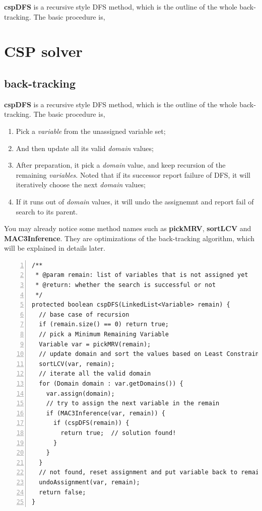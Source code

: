 \documentclass{article}
\begin{document}
\textbf{cspDFS} is a recursive style DFS method, which is the outline of the whole back-tracking. The basic procedure is,















\clearpage
\section{CSP solver}
\subsection{back-tracking}

\textbf{cspDFS} is a recursive style DFS method, which is the outline of the whole back-tracking. The basic procedure is,

\begin{enumerate}
  \item  Pick a \emph{variable} from the unassigned variable set;
  \item And then update all its valid \emph{domain} values;
  \item After preparation, it pick a \emph{domain} value, and keep recursion of the remaining \emph{variables}. Noted that if its successor report failure of DFS, it will iteratively choose the next \emph{domain} values;
\item   If it runs out of \emph{domain} values, it will undo the assignemnt and report fail of search to its parent.
\end{enumerate}

You may already notice some method names such as \textbf{pickMRV}, \textbf{sortLCV} and \textbf{MAC3Inference}. They are optimizations of the back-tracking algorithm, which will be explained in details later.

\begin{lstlisting}[numbers=left]
/**
 * @param remain: list of variables that is not assigned yet
 * @return: whether the search is successful or not
 */
protected boolean cspDFS(LinkedList<Variable> remain) {
  // base case of recursion
  if (remain.size() == 0) return true;
  // pick a Minimum Remaining Variable
  Variable var = pickMRV(remain);
  // update domain and sort the values based on Least Constraining
  sortLCV(var, remain);
  // iterate all the valid domain
  for (Domain domain : var.getDomains()) {
    var.assign(domain);
    // try to assign the next variable in the remain
    if (MAC3Inference(var, remain)) {
      if (cspDFS(remain)) {
        return true;  // solution found!
      }
    }
  }
  // not found, reset assignment and put variable back to remain
  undoAssignment(var, remain);
  return false;
}
\end{lstlisting}
\end{document}
